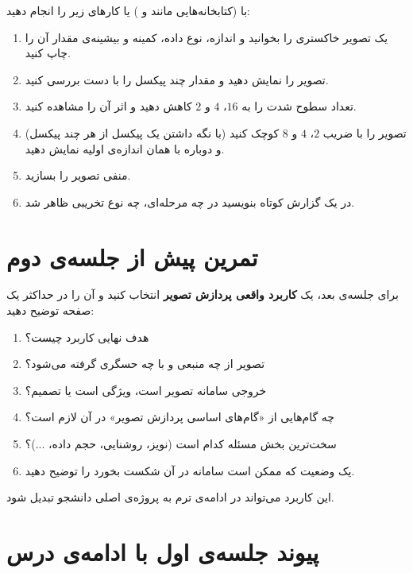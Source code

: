 \documentclass[11pt,a4paper]{article}
\begin{document}
	با  (کتابخانه‌هایی مانند  و ) یا  کارهای زیر را انجام دهید:
	
	\begin{enumerate}
		\item یک تصویر خاکستری را بخوانید و اندازه، نوع داده، کمینه و بیشینه‌ی مقدار آن را چاپ کنید.
		\item تصویر را نمایش دهید و مقدار چند پیکسل را با دست بررسی کنید.
		\item تعداد سطوح شدت را به $16$، $4$ و $2$ کاهش دهید و اثر آن را مشاهده کنید.
		\item تصویر را با ضریب $2$، $4$ و $8$ کوچک کنید (با نگه داشتن یک پیکسل از هر چند پیکسل)
		و دوباره با همان اندازه‌ی اولیه نمایش دهید.
		\item منفی تصویر را بسازید.
		\item در یک گزارش کوتاه بنویسید در چه مرحله‌ای، چه نوع تخریبی ظاهر شد.
	\end{enumerate}
	
	
	\section{تمرین پیش از جلسه‌ی دوم}
	
	برای جلسه‌ی بعد، یک \textbf{کاربرد واقعی پردازش تصویر} انتخاب کنید
	و آن را در حداکثر یک صفحه توضیح دهید:
	
	\begin{enumerate}
		\item هدف نهایی کاربرد چیست؟
		\item تصویر از چه منبعی و با چه حسگری گرفته می‌شود؟
		\item خروجی سامانه تصویر است، ویژگی است یا تصمیم؟
		\item چه گام‌هایی از «گام‌های اساسی پردازش تصویر» در آن لازم است؟
		\item سخت‌ترین بخش مسئله کدام است (نویز، روشنایی، حجم داده، ...)؟
		\item یک وضعیت که ممکن است سامانه در آن شکست بخورد را توضیح دهید.
	\end{enumerate}
	
	این کاربرد می‌تواند در ادامه‌ی ترم به پروژه‌ی اصلی دانشجو تبدیل شود.
	
	
	\section{پیوند جلسه‌ی اول با ادامه‌ی درس}
	
\end{document}
